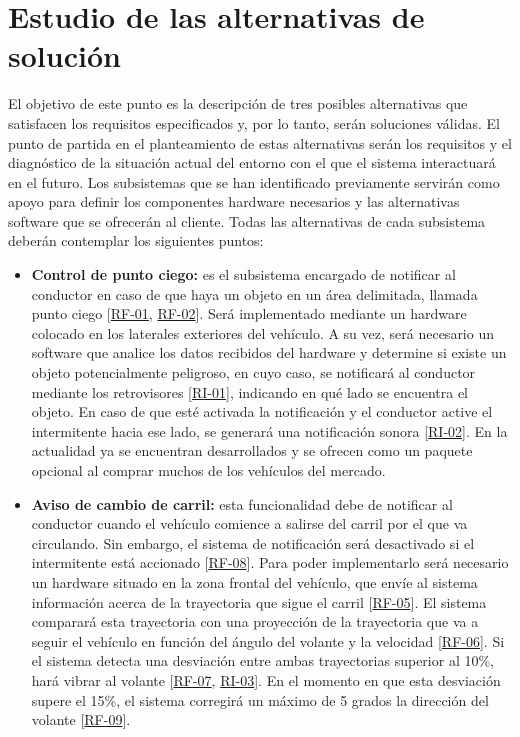 \section{Estudio de las alternativas de solución}
El objetivo de este punto es la descripción de tres posibles alternativas que satisfacen los requisitos especificados y, por lo tanto, serán soluciones válidas. El punto de partida en el planteamiento de estas alternativas serán los requisitos y el diagnóstico de la situación actual del entorno con el que el sistema interactuará en el futuro. Los subsistemas que se han identificado previamente servirán como apoyo para definir los componentes hardware necesarios y las alternativas software que se ofrecerán al cliente. Todas las alternativas de cada subsistema deberán contemplar los siguientes puntos:

\begin{itemize}[-]
\item \textbf{Control de punto ciego:} es el subsistema encargado de notificar al conductor en caso de que haya un objeto en un área delimitada, llamada punto ciego [\hyperref[tab:RF-01]{RF-01}, \hyperref[tab:RF-02]{RF-02}]. Será implementado mediante un hardware colocado en los laterales exteriores del vehículo. A su vez, será necesario un software que analice los datos recibidos del hardware y determine si existe un objeto potencialmente peligroso, en cuyo caso, se notificará al conductor mediante los retrovisores [\hyperref[tab:RI-01]{RI-01}], indicando en qué lado se encuentra el objeto. En caso de que esté activada la notificación y el conductor active el intermitente hacia ese lado, se generará una notificación sonora [\hyperref[tab:RI-02]{RI-02}]. En la actualidad ya se encuentran desarrollados y se ofrecen como un paquete opcional al comprar muchos de los vehículos del mercado.
\item \textbf{Aviso de cambio de carril:} esta funcionalidad debe de notificar al conductor cuando el vehículo comience a salirse del carril por el que va circulando. Sin embargo, el sistema de notificación será desactivado si el intermitente está accionado [\hyperref[tab:RF-08]{RF-08}]. Para poder implementarlo será necesario un hardware situado en la zona frontal del vehículo, que envíe al sistema información acerca de la trayectoria que sigue el carril [\hyperref[tab:RF-05]{RF-05}].  El sistema comparará esta trayectoria con una proyección de la trayectoria que va a seguir el vehículo en función del ángulo del volante y la velocidad [\hyperref[tab:RF-06]{RF-06}]. Si el sistema detecta una desviación entre ambas trayectorias superior al 10\%, hará vibrar al volante [\hyperref[tab:RF-07]{RF-07}, \hyperref[tab:RI-03]{RI-03}]. En el momento en que esta desviación supere el 15\%, el sistema corregirá un máximo de 5 grados la dirección del volante [\hyperref[tab:RF-09]{RF-09}].

\end{itemize}
